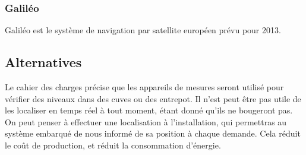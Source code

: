         \subsubsection{Galiléo}
	        Galiléo est le système de navigation par satellite européen prévu pour 2013.
	        
    \subsection{Alternatives}
        Le cahier des charges précise que les appareils de mesures seront utilisé pour vérifier des niveaux dans des cuves ou des entrepot.
        Il n'est peut être pas utile de les localiser en temps réel à tout moment, étant donné qu'ils ne bougeront pas.
        On peut penser à effectuer une localisation à l'installation, qui permettras au système embarqué de nous informé de sa position à chaque demande.
        Cela réduit le coût de production, et réduit la consommation d'énergie.
